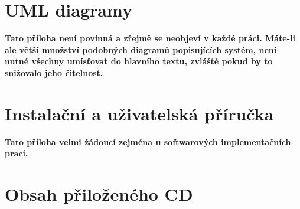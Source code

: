 \documentclass[11pt,twoside,a4paper]{book}
\begin{document}
\chapter{UML diagramy}
\textbf{\large Tato příloha není povinná a zřejmě se neobjeví v každé práci. Máte-li ale větší množství podobných diagramů popisujících systém, není nutné všechny umísťovat do hlavního textu, zvláště pokud by to snižovalo jeho čitelnost.}

\chapter{Instalační a uživatelská příručka}
\textbf{\large Tato příloha velmi žádoucí zejména u softwarových implementačních prací.}

\chapter{Obsah přiloženého CD}
\end{document}
